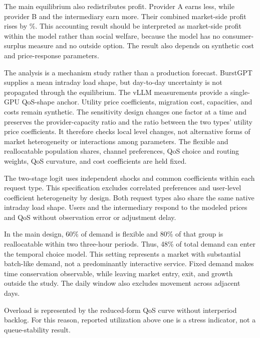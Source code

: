 \documentclass[11pt,a4paper]{article}
\begin{document}
The main equilibrium also redistributes profit. Provider A earns less, while provider B and the intermediary earn more. Their combined market-side profit rises by \MarketProfitChangePercent\%. This accounting result should be interpreted as market-side profit within the model rather than social welfare, because the model has no consumer-surplus measure and no outside option. The result also depends on synthetic cost and price-response parameters.

The analysis is a mechanism study rather than a production forecast. BurstGPT supplies a mean intraday load shape, but day-to-day uncertainty is not propagated through the equilibrium. The vLLM measurements provide a single-GPU QoS-shape anchor. Utility price coefficients, migration cost, capacities, and costs remain synthetic. The sensitivity design changes one factor at a time and preserves the provider-capacity ratio and the ratio between the two types' utility price coefficients. It therefore checks local level changes, not alternative forms of market heterogeneity or interactions among parameters. The flexible and reallocatable population shares, channel preferences, QoS choice and routing weights, QoS curvature, and cost coefficients are held fixed.

The two-stage logit uses independent shocks and common coefficients within each request type. This specification excludes correlated preferences and user-level coefficient heterogeneity by design. Both request types also share the same native intraday load shape. Users and the intermediary respond to the modeled prices and QoS without observation error or adjustment delay.

In the main design, 60\% of demand is flexible and 80\% of that group is reallocatable within two three-hour periods. Thus, 48\% of total demand can enter the temporal choice model. This setting represents a market with substantial batch-like demand, not a predominantly interactive service. Fixed demand makes time conservation observable, while leaving market entry, exit, and growth outside the study. The daily window also excludes movement across adjacent days.

Overload is represented by the reduced-form QoS curve without interperiod backlog. For this reason, reported utilization above one is a stress indicator, not a queue-stability result.
\end{document}
